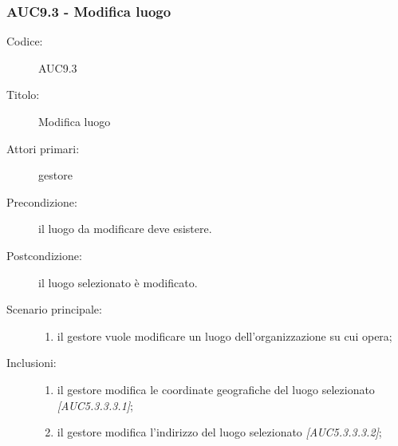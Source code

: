 \documentclass[../../../analisi-dei-requisiti.tex]{subfiles}
\begin{document}
\subsubsection{AUC9.3 - Modifica luogo}%
\label{subs:AUC9.3}
\begin{description}
  \item[Codice:] AUC9.3
  \item[Titolo:] Modifica luogo
  \item[Attori primari:] gestore
  \item[Precondizione:] il luogo da modificare deve esistere.
  \item[Postcondizione:] il luogo selezionato è modificato.
  \item[Scenario principale:]
  \begin{enumerate}
    \item il gestore vuole modificare un luogo dell'organizzazione su cui opera;
  \end{enumerate}
  \item[Inclusioni:]
  \begin{enumerate}
    \item il gestore modifica le coordinate geografiche del luogo selezionato \emph{[AUC5.3.3.3.1]};
    \item il gestore modifica l'indirizzo del luogo selezionato \emph{[AUC5.3.3.3.2]};
  \end{enumerate}
\end{description}
\end{document}
